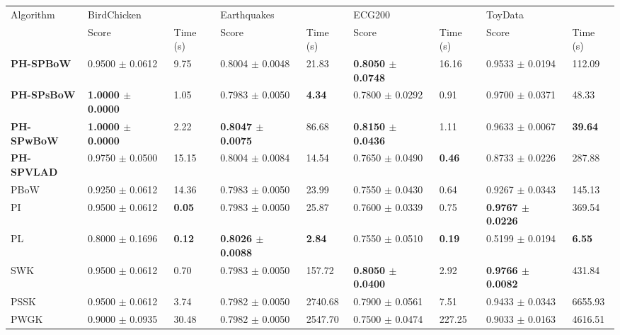 \documentclass[5GeSdc,ASOC,numref,printGA,printHL,CASflow,nocrossmark,longtitle,PROOF]{/usr/local/texlive/iTemplates/01-Templates/01-Els-Jnl/01-Standard_Templates/V1/ELS_MDL5-V1-6}
\begin{document}
\begin{articlestyle}
\begin{table}[!tb]%
{\begin{tabular*}{465pt}{@{\extracolsep\fill}@{\hskip6pt}lllllllll@{\hskip6pt}}
\toprule
\multirow[t]{2}{*}{Algorithm} & \multicolumn{2}{l}{BirdChicken} & \multicolumn{2}{l}{Earthquakes} & \multicolumn{2}{l}{ECG200} & \multicolumn{2}{l}{ToyData}\\
\cmidrule(l{6pt}r{6pt}){2-3} \cmidrule(l{6pt}r{6pt}){4-5} \cmidrule(l{6pt}r{6pt}){6-7} \cmidrule(l{6pt}){8-9}  & Score & Time (s) & Score & Time (s) & Score & Time (s) & Score & Time (s)\\
\colrule
\textbf{PH-SPBoW} & 0.9500 $\pm$ 0.0612 & 9.75 & 0.8004 $\pm$ 0.0048 & 21.83 & \textbf{0.8050 $\pm$ 0.0748} & 16.16 & 0.9533 $\pm$ 0.0194 & 112.09\\
\textbf{PH-SPsBoW} & \textbf{1.0000 $\pm$ 0.0000} & 1.05 & 0.7983 $\pm$ 0.0050 & \textbf{4.34} & 0.7800 $\pm$ 0.0292 & 0.91 & 0.9700 $\pm$ 0.0371 & 48.33\\
\textbf{PH-SPwBoW} & \textbf{1.0000 $\pm$ 0.0000} & 2.22 & \textbf{0.8047 $\pm$ 0.0075} & 86.68 & \textbf{0.8150 $\pm$ 0.0436} & 1.11 & 0.9633 $\pm$ 0.0067 & \textbf{39.64}\\
\textbf{PH-SPVLAD} & 0.9750 $\pm$ 0.0500 & 15.15  &0.8004 $\pm$ 0.0084 & 14.54 & 0.7650 $\pm$ 0.0490 & \textbf{0.46} & 0.8733 $\pm$ 0.0226 & 287.88\\
PBoW & 0.9250 $\pm$ 0.0612 & 14.36 & 0.7983 $\pm$ 0.0050 & 23.99 & 0.7550 $\pm$ 0.0430 & 0.64 & 0.9267 $\pm$ 0.0343 & 145.13\\
PI & 0.9500 $\pm$ 0.0612 &\textbf{0.05} & 0.7983 $\pm$ 0.0050 & 25.87 & 0.7600 $\pm$ 0.0339 & 0.75 & \textbf{0.9767 $\pm$ 0.0226} & 369.54\\
PL & 0.8000 $\pm$ 0.1696 & \textbf{0.12} & \textbf{0.8026 $\pm$ 0.0088} & \textbf{2.84} & 0.7550 $\pm$ 0.0510 &\textbf{0.19} & 0.5199 $\pm$ 0.0194 & \textbf{6.55}\\
SWK & 0.9500 $\pm$ 0.0612 & 0.70 & 0.7983 $\pm$ 0.0050 & 157.72 & \textbf{0.8050 $\pm$ 0.0400} & 2.92 & \textbf{0.9766 $\pm$ 0.0082} & 431.84\\
PSSK & 0.9500 $\pm$ 0.0612 & 3.74 & 0.7982 $\pm$ 0.0050 & 2740.68 & 0.7900 $\pm$ 0.0561 & 7.51 & 0.9433 $\pm$ 0.0343 & 6655.93\\
PWGK & 0.9000 $\pm$ 0.0935 & 30.48 & 0.7982 $\pm$ 0.0050 & 2547.70 & 0.7500 $\pm$ 0.0474 & 227.25 & 0.9033 $\pm$ 0.0163 & 4616.51\\

\end{tabular*}}
\end{table}
\end{articlestyle}
\end{document}

